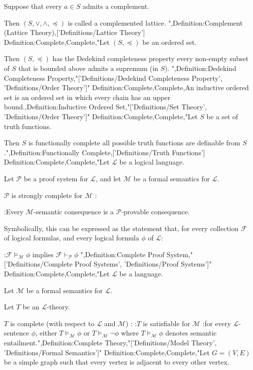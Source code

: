 Suppose that every $a \in S$ admits a complement.


Then $\left( S, \vee, \wedge, \preceq \right)$ is called a complemented lattice.
",Definition:Complement (Lattice Theory),['Definitions/Lattice Theory']
Definition:Complete,Complete,"Let $\left( S, \preceq \right)$ be an ordered set.

Then $\left( S, \preceq \right)$ has the Dedekind completeness property  every non-empty subset of $S$ that is bounded above admits a supremum (in $S$).
",Definition:Dedekind Completeness Property,"['Definitions/Dedekind Completeness Property', 'Definitions/Order Theory']"
Definition:Complete,Complete,An inductive ordered set is an ordered set in which every chain has an upper bound.,Definition:Inductive Ordered Set,"['Definitions/Set Theory', 'Definitions/Order Theory']"
Definition:Complete,Complete,"Let $S$ be a set of truth functions.


Then $S$ is functionally complete  all possible truth functions are definable from $S$.",Definition:Functionally Complete,['Definitions/Truth Functions']
Definition:Complete,Complete,"Let $\mathcal L$ be a logical language.

Let $\mathscr P$ be a proof system for $\mathcal L$, and let $\mathscr M$ be a formal semantics for $\mathcal L$.


$\mathscr P$ is strongly complete for $\mathscr M$ :

:Every $\mathscr M$-semantic consequence is a $\mathscr P$-provable consequence.

Symbolically, this can be expressed as the statement that, for every collection $\mathcal F$ of logical formulas, and every logical formula $\phi$ of $\mathcal L$:

:$\mathcal F \models_{\mathscr M} \phi$ implies $\mathcal F \vdash_{\mathscr P} \phi$
",Definition:Complete Proof System,"['Definitions/Complete Proof Systems', 'Definitions/Proof Systems']"
Definition:Complete,Complete,"Let $\mathcal L$ be a language.

Let $\mathscr M$ be a formal semantics for $\mathcal L$.

Let $T$ be an $\mathcal L$-theory.


$T$ is complete (with respect to $\mathcal L$ and $\mathscr M$) :
:$T$ is satisfiable for $\mathscr M$
:for every $\mathcal L$-sentence $\phi$, either $T \models_{\mathscr M} \phi$ or $T \models_{\mathscr M} \neg \phi$
where $T \models_{\mathscr M} \phi$ denotes semantic entailment.",Definition:Complete Theory,"['Definitions/Model Theory', 'Definitions/Formal Semantics']"
Definition:Complete,Complete,"Let $G = \left( V, E \right)$ be a simple graph such that every vertex is adjacent to every other vertex.


